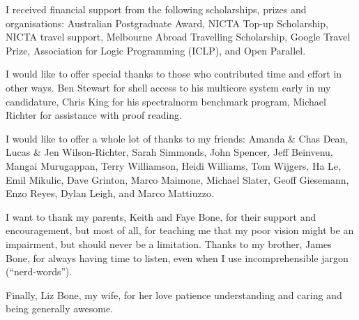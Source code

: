 \documentclass[a4paper,twoside,openright]{report}
\begin{document}
I received financial support from the following scholarships, prizes and
organisations:
Australian Postgraduate Award,
NICTA Top-up Scholarship,
NICTA travel support,
Melbourne Abroad Travelling Scholarship,
Google Travel Prize,
Association for Logic Programming (ICLP),
and
Open Parallel.

I would like to offer special thanks to those who contributed time and
effort in other ways.
Ben Stewart for shell access to his multicore system early in my candidature,
Chris King for his spectralnorm benchmark program,
Michael Richter for assistance with proof reading.

I would like to offer a whole lot of thanks to my friends:
Amanda \& Chas Dean,
Lucas \& Jen Wilson-Richter,
Sarah Simmonds, John Spencer,
Jeff Beinvenu, Mangai Murugappan,
Terry Williamson, Heidi Williams,
Tom Wijgers,
Ha Le,
Emil Mikulic,
Dave Grinton,
Marco Maimone,
Michael Slater,
Geoff Giesemann,
Enzo Reyes,
Dylan Leigh,
and Marco Mattiuzzo.

I want to thank my parents, Keith and Faye Bone, for their support and
encouragement,
but most of all,
for teaching me that my poor vision might be an impairment, but should never
be a limitation.
Thanks to my brother, James Bone, for always having time to listen,
even when I use incomprehensible jargon (``nerd-words'').

Finally, Liz Bone, my wife,
for her love patience understanding and caring
and being generally awesome.


\tableofcontents

\listoffigures

\listoftables

\listofalgorithms










\raggedright

\end{document}
